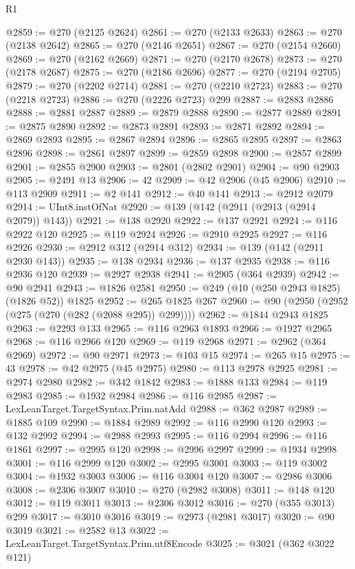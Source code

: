 \begin{lexlean}{R1}
\begin{coremodule}
@2859 := @270 (@2125 @2624)
@2861 := @270 (@2133 @2633)
@2863 := @270 (@2138 @2642)
@2865 := @270 (@2146 @2651)
@2867 := @270 (@2154 @2660)
@2869 := @270 (@2162 @2669)
@2871 := @270 (@2170 @2678)
@2873 := @270 (@2178 @2687)
@2875 := @270 (@2186 @2696)
@2877 := @270 (@2194 @2705)
@2879 := @270 (@2202 @2714)
@2881 := @270 (@2210 @2723)
@2883 := @270 (@2218 @2723)
@2886 := @270 (@2226 @2723) @299
@2887 := @2883 @2886
@2888 := @2881 @2887
@2889 := @2879 @2888
@2890 := @2877 @2889
@2891 := @2875 @2890
@2892 := @2873 @2891
@2893 := @2871 @2892
@2894 := @2869 @2893
@2895 := @2867 @2894
@2896 := @2865 @2895
@2897 := @2863 @2896
@2898 := @2861 @2897
@2899 := @2859 @2898
@2900 := @2857 @2899
@2901 := @2855 @2900
@2903 := @2801 (@2802 @2901)
@2904 := @90 @2903
@2905 := @2491 @13
@2906 := 42
@2909 := @42 @2906 (@45 @2906)
@2910 := @113 @2909
@2911 := @2 @141
@2912 := @40 @141
@2913 := @2912 @2079
@2914 := UInt8.instOfNat
@2920 := @139 (@142 (@2911 (@2913 (@2914 @2079)) @143))
@2921 := @138 @2920
@2922 := @137 @2921
@2924 := @116 @2922 @120
@2925 := @119 @2924
@2926 := @2910 @2925
@2927 := @116 @2926
@2930 := @2912 @312 (@2914 @312)
@2934 := @139 (@142 (@2911 @2930 @143))
@2935 := @138 @2934
@2936 := @137 @2935
@2938 := @116 @2936 @120
@2939 := @2927 @2938
@2941 := @2905 (@364 @2939)
@2942 := @90 @2941
@2943 := @1826 @2581
@2950 := @249 (@10 (@250 @2943 @1825) (@1826 @52)) @1825
@2952 := @265 @1825 @267
@2960 := @90 (@2950 (@2952 (@275 (@270 (@282 (@2088 @295)) @299))))
@2962 := @1844 @2943 @1825
@2963 := @2293 @133
@2965 := @116 @2963 @1893
@2966 := @1927 @2965
@2968 := @116 @2966 @120
@2969 := @119 @2968
@2971 := @2962 (@364 @2969)
@2972 := @90 @2971
@2973 := @103 @15
@2974 := @265 @15
@2975 := 43
@2978 := @42 @2975 (@45 @2975)
@2980 := @113 @2978 @2925
@2981 := @2974 @2980
@2982 := @342 @1842
@2983 := @1888 @133
@2984 := @119 @2983
@2985 := @1932 @2984
@2986 := @116 @2985
@2987 := LexLeanTarget.TargetSyntax.Prim.natAdd
@2988 := @362 @2987
@2989 := @1885 @109
@2990 := @1884 @2989
@2992 := @116 @2990 @120
@2993 := @132 @2992
@2994 := @2988 @2993
@2995 := @116 @2994
@2996 := @116 @1861
@2997 := @2995 @120
@2998 := @2996 @2997
@2999 := @1934 @2998
@3001 := @116 @2999 @120
@3002 := @2995 @3001
@3003 := @119 @3002
@3004 := @1932 @3003
@3006 := @116 @3004 @120
@3007 := @2986 @3006
@3008 := @2306 @3007
@3010 := @270 (@2982 @3008)
@3011 := @148 @120
@3012 := @119 @3011
@3013 := @2306 @3012
@3016 := @270 (@355 @3013) @299
@3017 := @3010 @3016
@3019 := @2973 (@2981 @3017)
@3020 := @90 @3019
@3021 := @2582 @13
@3022 := LexLeanTarget.TargetSyntax.Prim.utf8Encode
@3025 := @3021 (@362 @3022 @121)

\end{coremodule}
\end{lexlean}
